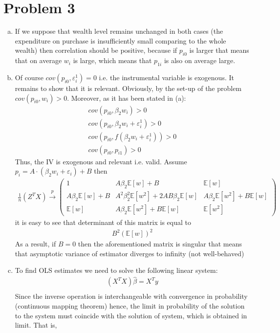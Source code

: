 \documentclass[a4paper]{article}
\newcommand{\expect}{\mathbb{E}}
\begin{document}
\section*{Problem 3}
\begin{enumerate}[(a)]
	\item If we suppose that wealth level remains unchanged in both cases (the expenditure on purchase is insufficiently small comparing to the whole wealth) then correlation should be positive, because if $p_{i0}$ is larger that means that on average $w_i$ is large, which means that $p_{1i}$ is also on average large.
	\item Of course $cov(p_{i0}, \varepsilon_{i}^1) = 0$ i.e. the instrumental variable is exogenous. It remains to show that it is relevant. Obviously, by the set-up of the problem $cov(p_{i0}, w_i) > 0$. Moreover, as it has been stated in (a):
	\begin{align*}
	cov(p_{i0}, \beta_2w_i) > 0\\
	cov(p_{i0}, \beta_2w_i + \varepsilon_i^1) > 0\\
	cov(p_{i0}, f(\beta_2w_i + \varepsilon_i^1)) > 0\\
	cov(p_{i0}, p_{i1}) > 0
	\end{align*}
	Thus, the IV is exogenous and relevant i.e. valid. Assume $p_i = A \cdot (\beta_2 w_i + \varepsilon_i) + B$ then
	\begin{align*}
	\frac{1}{n} (Z^TX) \overset{p}{\to} \begin{pmatrix}
	1 & A\beta_2 \expect [w] + B & \expect[w]\\
	A\beta_2\expect[w] + B & A^2\beta_2^2\expect[w^2] + 2AB\beta_2\expect[w]& A\beta_2 \expect[w^2]+B\expect[w]\\
	\expect[w]& A\beta_2 \expect[w^2]+B\expect[w] & \expect[w^2]
	\end{pmatrix}
	\end{align*}
	it is easy to see that determinant of this matrix is equal to
	\begin{align*}
	B^2 (\expect[w])^2
	\end{align*}
	As a result, if $B = 0$ then the aforementioned matrix is singular that means that asymptotic variance of estimator diverges to infinity (not well-behaved)
	\item To find OLS estimates we need to solve the following linear system:
	\begin{align*}
	(X^TX) \hat{\beta} = X^Ty\\
	\end{align*}
	Since the inverse operation is interchangeable with convergence in probability (continuous mapping theorem) hence, the limit in probability of the solution to the system must coincide with the solution of system, which is obtained in limit. That is,

\end{enumerate}
\end{document}

